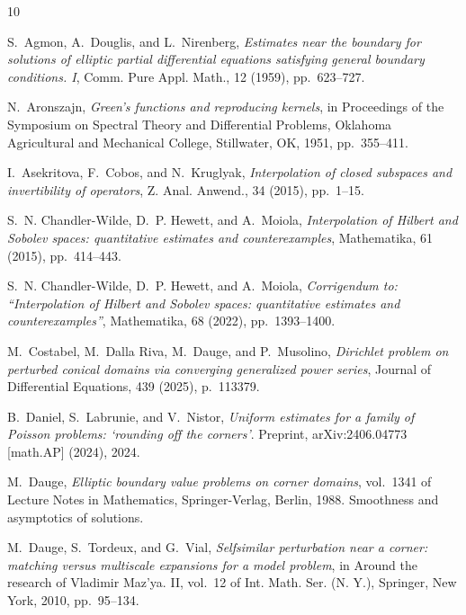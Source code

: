 \documentclass[titlepage,12pt]{amsart}
\theoremstyle{definition}
\theoremstyle{remark}
\numberwithin{equation}{section}
\begin{document}
%
%

\begin{thebibliography}{10}

{\sc S.~Agmon, A.~Douglis, and L.~Nirenberg}, {\em Estimates near the boundary
  for solutions of elliptic partial differential equations satisfying general
  boundary conditions. {I}}, Comm. Pure Appl. Math., 12 (1959), pp.~623--727.

{\sc N.~Aronszajn}, {\em Green's functions and reproducing kernels}, in
  Proceedings of the {S}ymposium on {S}pectral {T}heory and {D}ifferential
  {P}roblems, Oklahoma Agricultural and Mechanical College, Stillwater, OK,
  1951, pp.~355--411.

{\sc I.~Asekritova, F.~Cobos, and N.~Kruglyak}, {\em Interpolation of closed
  subspaces and invertibility of operators}, Z. Anal. Anwend., 34 (2015),
  pp.~1--15.

{\sc S.~N. Chandler-Wilde, D.~P. Hewett, and A.~Moiola}, {\em Interpolation of
  {Hilbert} and {Sobolev} spaces: quantitative estimates and counterexamples},
  Mathematika, 61 (2015), pp.~414--443.

{\sc S.~N. Chandler-Wilde, D.~P. Hewett, and A.~Moiola}, {\em Corrigendum to:
  ``{Interpolation} of {Hilbert} and {Sobolev} spaces: quantitative estimates
  and counterexamples''}, Mathematika, 68 (2022), pp.~1393--1400.

{\sc M.~Costabel, M.~{Dalla Riva}, M.~Dauge, and P.~Musolino}, {\em Dirichlet
  problem on perturbed conical domains via converging generalized power
  series}, Journal of Differential Equations, 439 (2025), p.~113379.

{\sc B.~Daniel, S.~Labrunie, and V.~Nistor}, {\em Uniform estimates for a
  family of {Poisson} problems: `rounding off the corners'}.
\newblock Preprint, {arXiv}:2406.04773 [math.{AP}] (2024), 2024.

{\sc M.~Dauge}, {\em Elliptic boundary value problems on corner domains},
  vol.~1341 of Lecture Notes in Mathematics, Springer-Verlag, Berlin, 1988.
\newblock Smoothness and asymptotics of solutions.

{\sc M.~Dauge, S.~Tordeux, and G.~Vial}, {\em Selfsimilar perturbation near a
  corner: matching versus multiscale expansions for a model problem}, in Around
  the research of {V}ladimir {M}az'ya. {II}, vol.~12 of Int. Math. Ser. (N.
  Y.), Springer, New York, 2010, pp.~95--134.


\end{thebibliography}
\end{document}
